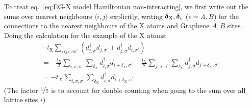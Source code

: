 \documentclass[../main.tex]{subfiles}
\begin{document}
To treat eq.~\ref{eq:EG-X model Hamiltonian non-interacting}, we first write out the sums over nearest neighbours \(\langle i, j \rangle\) explicitly, writing \(\bm{\mathrm{\delta}}_{\mathrm{X}}, \bm{\mathrm{\delta}}_{\epsilon}\) (\(\epsilon = A, B\)) for the connections to the nearest neighbours of the \(\mathrm{X}\) atoms and Graphene \(A, B\) sites.
Doing the calculation for the example of the \(\mathrm{X}\) atoms:
\begin{align}
    &-t_{\mathrm{X}} \sum_{\langle ij \rangle, \sigma \sigma^{\prime}} (d_{i, \sigma}^{\dagger} d_{j, \sigma^{\prime}} + d_{j, \sigma}^{\dagger} d_{i, \sigma^{\prime}}) \\
    &= -\frac{t_X}{2} \sum_{i,\sigma, \sigma^{\prime}} \sum_{\delta_{\mathrm{X}}} d_{i, \sigma}^{\dagger} d_{i + \delta_{\mathrm{X}}, \sigma^{\prime}}
    -\frac{t_X}{2} \sum_{j,\sigma, \sigma^{\prime}} \sum_{\delta_{\mathrm{X}}} d_{j, \sigma}^{\dagger} d_{j + \delta_{\mathrm{X}}, \sigma^{\prime}} \\
    &= -t_X \sum_{i,\sigma, \sigma^{\prime}} \sum_{\delta_{\mathrm{X}}} d_{i, \sigma}^{\dagger} d_{i + \delta_{\mathrm{X}}, \sigma^{\prime}}
    \label{eq:EG-X model X atoms nearest neighbours written out}
\end{align}
(The factor \(\nicefrac{1}{2}\) is to account for double counting when going to the sum over all lattice sites \(i\))
\end{document}
